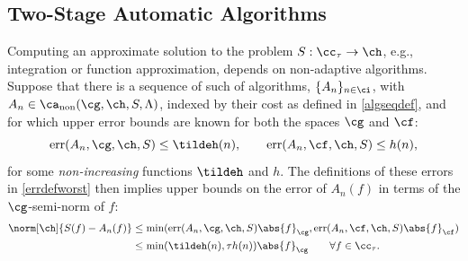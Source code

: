\documentclass[]{elsarticle}
\DeclareMathOperator{\fix}{non}
\DeclareMathOperator{\err}{err}
\theoremstyle{definition}
\theoremstyle{remark}
\newcommand{\Fnorm}[1]{\abs{#1}_{\cf}}
\newcommand{\Gnorm}[1]{\abs{#1}_{\cg}}
\begin{document}
\subsection{Two-Stage Automatic Algorithms} \label{twostagesec}

Computing an approximate solution to the problem $S: \cc_{\tau} \to \ch$, e.g., integration or function approximation, depends on non-adaptive algorithms. Suppose that there is a sequence of such of algorithms, $\{A_n\}_{n \in \ci}$, with $A_n  \in \ca_{\fix}(\cg,\ch,S,\Lambda)$, indexed by their cost as defined in \eqref{algseqdef}, and for which upper error bounds are known for both the spaces $\cg$ and $\cf$:
\begin{equation}\label{algseqerrbd}
\err(A_n,\cg,\ch,S) \le \tildeh(n), \qquad \err(A_n,\cf,\ch,S) \le h(n), 
\end{equation}
for some \emph{non-increasing} functions $\tildeh$ and $h$.  The definitions of these errors in \eqref{errdefworst} then implies upper bounds on the error of $A_n(f)$ in terms of the $\cg$-semi-norm of $f$:
\begin{align} \nonumber
\norm[\ch]{S(f) -  A_n(f)} &\le \min(\err(A_n,\cg,\ch,S)\Gnorm{f},\err(A_n,\cf,\ch,S)\Fnorm{f}) \\
\label{Anerrbound}
&\le \min(\tildeh(n),\tau h(n))\Gnorm{f} \qquad \forall f \in \cc_{\tau}.
\end{align}
\end{document}
